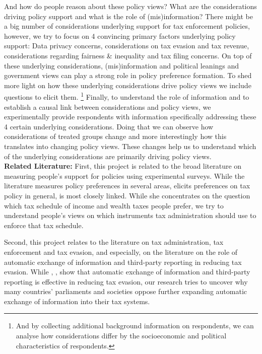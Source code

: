 \documentclass[11pt]{article}
\begin{document}
And how do people reason about these policy views? What are the considerations driving policy support and what is the role of (mis)information? There might be a big number of considerations underlying support for tax enforcement policies, however, we try to focus on 4 convincing primary factors underlying policy support: Data privacy concerns, considerations on tax evasion and tax revenue, considerations regarding fairness \& inequality and tax filing concerns. On top of these underlying considerations, (mis)information and political leanings and government views can play a strong role in policy preference formation. To shed more light on how these underlying considerations drive policy views we include questions to elicit them. \footnote{And by collecting additional background information on respondents, we can analyse how considerations differ by the socioeconomic and political characteristics of respondents.} Finally, to understand the role of information and to establish a causal link between considerations and policy views, we experimentally provide respondents with information specifically addressing these 4 certain underlying considerations. Doing that we can observe how considerations of treated groups change and more interestingly how this translates into changing policy views. These changes help us to understand which of the underlying considerations are primarily driving policy views. \\[0.5em]
\textbf{Related Literature:} First, this project is related to the broad literature on measuring people's support for policies using experimental surveys. While the literature measures policy preferences in several areas, \textcite{stantcheva2021understanding} elicits preferences on tax policy in general, is most closely linked. While she concentrates on the question which tax schedule of income and wealth taxes people prefer, we try to understand people's views on which instruments tax administration should use to enforce that tax schedule. 

Second, this project relates to the literature on tax administration, tax enforcement and tax evasion, and especially, on the literature on the role of automatic exchange of information and third-party reporting in reducing tax evasion. While \textcite{kleven2011unwilling}, \textcite{pomeranz2015no}, \textcite{slemrod2017does} show that automatic exchange of information and third-party reporting is effective in reducing tax evasion, our research tries to uncover why many countries' parliaments and societies oppose further expanding automatic exchange of information into their tax systems. 
\end{document}
